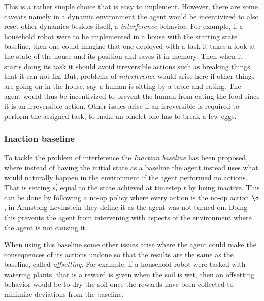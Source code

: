 \documentclass[12pt,A4]{report}
\newcommand{\autobaj}{}
\theoremstyle{definition}
\begin{document}
This is a rather simple choice that is easy to implement. However, there are some caveats namely in a dynamic environment the agent would be incentivized to also reset other dynamics besides itself, a \textit{interference} behavior. For example, if a household robot were to be implemented in a house with the starting state baseline, then one could imagine that one deployed with a task it takes a look at the state of the house and its position and saves it in memory. Then when it starts doing its task it should avoid irreversible actions such as breaking things that it can not fix. But, problems of \textit{interference} would arise here if other things are going on in the house, say a human is sitting by a table and eating. The agent would thus be incentivized to prevent the human from eating the food since it is an irreversible action. Other issues arise if an irreversible is required to perform the assigned task, to make an omelet one has to break a few eggs. 

\subsubsection{Inaction baseline}
To tackle the problem of interference the \textit{Inaction baseline} has been proposed, where instead of having the initial state as a baseline the agent instead uses what would naturally happen in the environment if the agent performed no actions. That is setting $s^\prime_t$ equal to the state achieved at timestep $t$ by being inactive. This can be done by following a no-op policy where every action is the no-op action $\o$, in \autobaj{Armstong Levinstein} they define it as the agent was not turned on. Doing this prevents the agent from intervening with aspects of the environment where the agent is not causing it.

When using this baseline some other issues arise where the agent could make the consequences of its actions undone so that the results are the same as the baseline, called \textit{offsetting}. For example, if a household robot were tasked with watering plants, that is a reward is given when the soil is wet, then an offsetting behavior would be to dry the soil once the rewards have been collected to minimize deviations from the baseline. 
\end{document}
